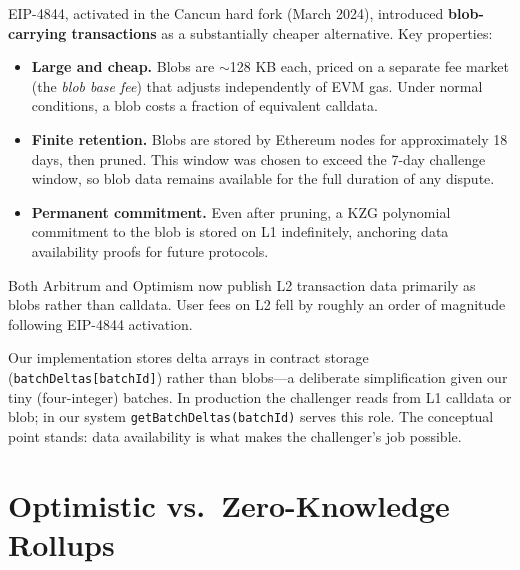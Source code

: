 \documentclass[11pt,letterpaper]{article}
\begin{document}
EIP-4844, activated in the Cancun hard fork (March 2024), introduced \textbf{blob-carrying transactions} as a substantially cheaper alternative. Key properties:

\begin{itemize}[leftmargin=*, itemsep=2pt]
    \item \textbf{Large and cheap.} Blobs are $\sim$128 KB each, priced on a separate fee market (the \emph{blob base fee}) that adjusts independently of EVM gas. Under normal conditions, a blob costs a fraction of equivalent calldata.
    \item \textbf{Finite retention.} Blobs are stored by Ethereum nodes for approximately 18 days, then pruned. This window was chosen to exceed the 7-day challenge window, so blob data remains available for the full duration of any dispute.
    \item \textbf{Permanent commitment.} Even after pruning, a KZG polynomial commitment to the blob is stored on L1 indefinitely, anchoring data availability proofs for future protocols.
\end{itemize}

Both Arbitrum and Optimism now publish L2 transaction data primarily as blobs rather than calldata. User fees on L2 fell by roughly an order of magnitude following EIP-4844 activation.

Our implementation stores delta arrays in contract storage (\texttt{batchDeltas[batchId]}) rather than blobs---a deliberate simplification given our tiny (four-integer) batches. In production the challenger reads from L1 calldata or blob; in our system \texttt{getBatchDeltas(batchId)} serves this role. The conceptual point stands: data availability is what makes the challenger's job possible.

\section{Optimistic vs.\ Zero-Knowledge Rollups}
\end{document}
